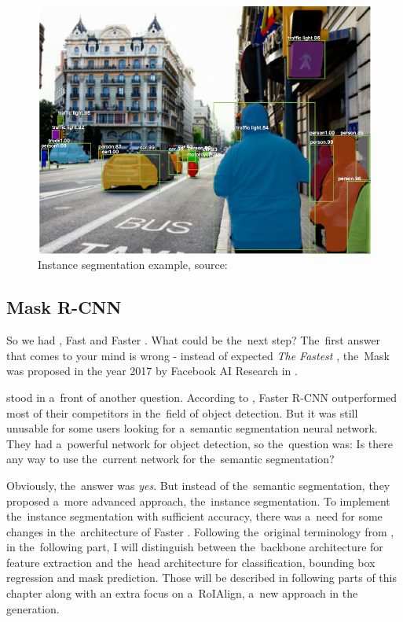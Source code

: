 \begin{figure}[H]
   \centering
	\includegraphics[width=0.8\linewidth]{./pictures/instance-segmentation.png}
	\caption[Instance segmentation example]{Instance segmentation example, source: 
\cite{mask-rcnn}}
      \label{fig:instance-segmentation}
\end{figure}

\subsection{Mask R-CNN}
\label{mask-rcnn}

So we had , Fast  and Faster . What could be
the~next step? The~first answer that comes to your mind is wrong - instead of 
expected \textit{The Fastest }, the~Mask  was proposed in 
the year 2017 by Facebook AI Research  in \cite{mask-rcnn}.

 stood in a~front of another question. According to \cite{faster-rcnn}, 
Faster R-CNN outperformed most of their competitors in the~field of object 
detection. But it was still unusable for some users looking for a~semantic 
segmentation neural network. They had a~powerful network for object detection, 
so the~question was: Is there any way to use the~current network for
the~semantic segmentation?

Obviously, the~answer was \textit{yes}. But instead of the~semantic 
segmentation, they proposed a~more advanced approach, the~instance segmentation. 
To implement the~instance segmentation with sufficient accuracy, there was
a~need for some changes in the~architecture of Faster . Following
the~original terminology from \cite{mask-rcnn}, in the~following part, I will 
distinguish between the~backbone architecture for feature extraction and
the~head architecture for classification, bounding box regression and mask 
prediction. Those will be described in following parts of this chapter along 
with an extra focus on a~RoIAlign, a~new approach in the~ generation.

